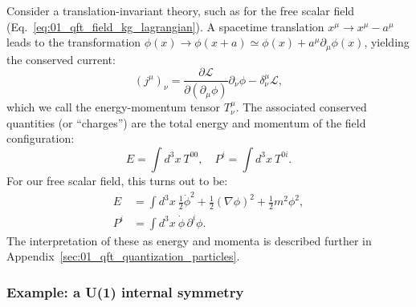 Consider a translation-invariant theory, such as for the free scalar field (Eq.~\ref{eq:01_qft_field_kg_lagrangian}).
A spacetime translation $x^\mu \rightarrow x^\mu - a^\mu$ leads to the transformation $\phi(x) \rightarrow \phi(x + a) \simeq \phi(x) + a^\mu \partial_\mu \phi(x)$, yielding the conserved current:
\begin{equation}
	\label{eq:01_qft_symmetries_current_translation}
	(j^\mu)_\nu = \frac{\partial\mathcal L}{\partial(\partial_\mu\phi)}\partial_\nu\phi - \delta^\mu_\nu \mathcal L,
\end{equation}
which we call the energy-momentum tensor $T^{\mu}_\nu$.
The associated conserved quantities (or ``charges'') are the total energy and momentum of the field configuration:
\begin{equation}
    \label{eq:01_qft_symmetries_charge_translation}
    E = \int d^3x\ T^{00}, \quad P^i = \int d^3x\ T^{0i}.
\end{equation}
For our free scalar field, this turns out to be:
\begin{equation}
    \label{eq:01_qft_symmetries_charge_translation_kg}
    \begin{split}
        E &= \int d^3x\ \frac{1}{2}\dot\phi^2 + \frac{1}{2}(\nabla\phi)^2 + \frac{1}{2}m^2\phi^2, \\
        P^i &= \int d^3x\ \dot\phi\,\partial^i\phi.
    \end{split}
\end{equation}
The interpretation of these as energy and momenta is described further in Appendix~\ref{sec:01_qft_quantization_particles}.

\subsubsection{Example: a U(1) internal symmetry}

